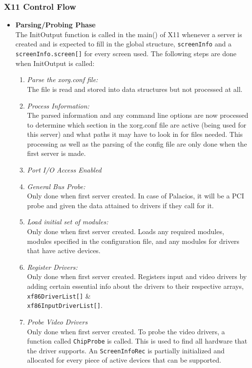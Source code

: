 \documentclass{acm_proc_article-sp}
\begin{document}
\subsubsection{X11 Control Flow}
\begin{itemize}
\item \textbf{Parsing/Probing Phase} \\
The InitOutput function is called in the main() of X11 whenever a server is created and is expected to fill in the global structure, {\tt screenInfo} and a {\tt screenInfo.screen[]} for every screen used.\cite{xorgman} The following steps are done when InitOutput is called:
\begin{enumerate}
\item \textit{Parse the xorg.conf file:} \\
The file is read and stored into data structures but not processed at all. \cite{xorgman}
\item \textit{Process Information:} \\
The parsed information and any command line options are now processed to determine which section in the xorg.conf file are active (being used for this server) and what paths it may have to look in for files needed. \cite{xorgman}
This processing as well as the parsing of the config file are only done when the first server is made. 
\item \textit{Port I/O Access Enabled}
\item \textit{General Bus Probe:} \\
Only done when first server created. In case of Palacios, it will be a PCI probe and given the data attained to drivers if they call for it.\cite{xorgman}
\item \textit{Load initial set of modules:} \\
Only done when first server created. Loads any required modules, modules specified in the configuration file, and any modules for drivers that have active devices.\cite{xorgman}
\item \textit{Register Drivers:} \\
Only done when first server created. Registers input and video drivers by adding certain essential info about the drivers to their respective arrays, {\tt xf86DriverList[]} \& \\ {\tt xf86InputDriverList[]}. \cite{xorgman}
\item \textit{Probe Video Drivers} \\
Only done when first server created. To probe the video drivers, a function called {\tt ChipProbe} is called. This is used to find all hardware that the driver supports. An {\tt ScreenInfoRec} is partially initialized and allocated for every piece of active devices that can be supported. \cite{xorgman}

\end{enumerate}
\end{itemize}
\end{document}
